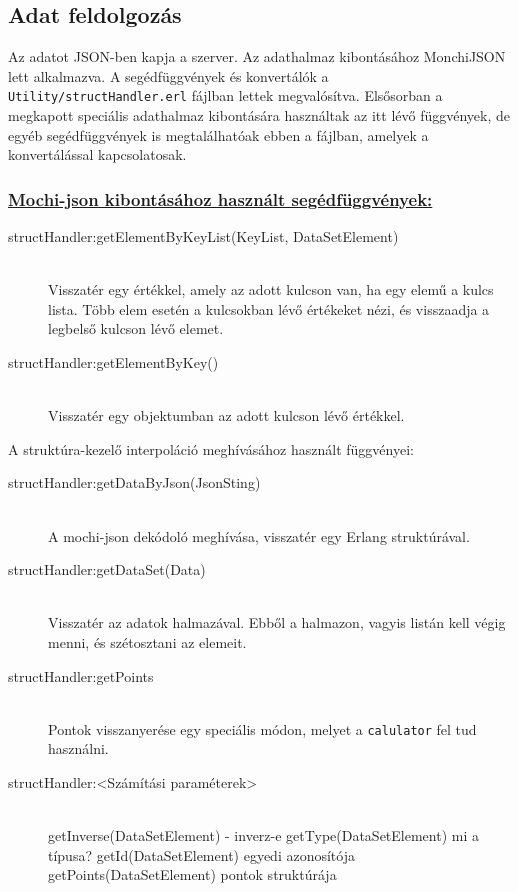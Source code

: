 \subsection{Adat feldolgozás}
	Az adatot JSON-ben kapja a szerver. Az adathalmaz kibontásához MonchiJSON lett alkalmazva. 
	A segédfüggvények és konvertálók a \texttt{Utility/structHandler.erl} fájlban lettek megvalósítva.\newline
	Elsősorban a megkapott speciális adathalmaz kibontására használtak az itt lévő függvények, de egyéb segédfüggvények is megtalálhatóak ebben a fájlban, amelyek a konvertálással kapcsolatosak.

	\subsubsection{\underline{
		Mochi-json kibontásához használt segédfüggvények:
	}}
	\begin{description}
		\item[structHandler:getElementByKeyList(KeyList, DataSetElement)] \hfill \\ 
		Visszatér egy értékkel, amely az adott kulcson van, ha egy elemű a kulcs lista. Több elem esetén a kulcsokban lévő értékeket nézi, és visszaadja a legbelső kulcson lévő elemet.

		\item[structHandler:getElementByKey()] \hfill \\ 
		Visszatér egy objektumban az adott kulcson lévő értékkel.
	\end{description}
	A struktúra-kezelő interpoláció meghívásához használt függvényei:
	\begin{description}

		\item[structHandler:getDataByJson(JsonSting)] \hfill \\
		A mochi-json dekódoló meghívása, visszatér egy Erlang struktúrával.
		
		\item[structHandler:getDataSet(Data)]\hfill \\ 
		Visszatér az adatok halmazával. Ebből a halmazon, vagyis listán kell végig menni, és szétosztani az elemeit. 
		
		\item[structHandler:getPoints] \hfill \\
		Pontok visszanyerése egy speciális módon, melyet a \texttt{calulator} fel tud használni.

		

		\item[structHandler:<Számítási paraméterek>] \hfill \\ 
		getInverse(DataSetElement) - inverz-e \newline
		getType(DataSetElement) mi a típusa? \newline
		getId(DataSetElement) egyedi azonosítója \newline
		getPoints(DataSetElement) pontok struktúrája
	\end{description}
